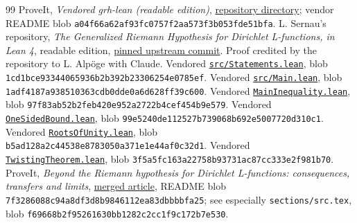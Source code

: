\documentclass[11pt]{article}
\theoremstyle{remark}\newtheorem{remark}[theorem]{Remark}
\newcommand{\code}[1]{\texttt{#1}}
\begin{document}
\begin{thebibliography}{99}
 ProveIt, \emph{Vendored grh-lean (readable edition)}, \href{https://github.com/VladimirReshetnikov/ProveIt/tree/main/Analysis/GeneralizedRiemannHypothesis/vendor/grh-lean}{repository directory}; vendor README blob \texttt{a04f66a62af93fc0757f2aa573f3b053fde51bfa}.
 L. Sernau's repository, \emph{The Generalized Riemann Hypothesis for Dirichlet L-functions, in Lean 4}, readable edition, \href{https://github.com/lsernau/grh-lean/tree/72fead102f663d5c7a407964a13dc0cf9d977207/grh}{pinned upstream commit}. Proof credited by the repository to L. Alp\"oge with Claude.
 Vendored \href{https://github.com/VladimirReshetnikov/ProveIt/blob/main/Analysis/GeneralizedRiemannHypothesis/vendor/grh-lean/grh/src/Statements.lean}{\texttt{src/Statements.lean}}, blob \texttt{1cd1bce93344065936b2b392b23306254e0785ef}.
 Vendored \href{https://github.com/VladimirReshetnikov/ProveIt/blob/main/Analysis/GeneralizedRiemannHypothesis/vendor/grh-lean/grh/src/Main.lean}{\texttt{src/Main.lean}}, blob \texttt{1adf4187a938510363cdb0dde0a6d628ff39c600}.
 Vendored \href{https://github.com/VladimirReshetnikov/ProveIt/blob/main/Analysis/GeneralizedRiemannHypothesis/vendor/grh-lean/grh/src/New/Reduction/MainInequality.lean}{\texttt{MainInequality.lean}}, blob \texttt{97f83ab52b2feb420e952a2722b4cef454b9e579}.
 Vendored \href{https://github.com/VladimirReshetnikov/ProveIt/blob/main/Analysis/GeneralizedRiemannHypothesis/vendor/grh-lean/grh/src/New/Reduction/OneSidedBound.lean}{\texttt{OneSidedBound.lean}}, blob \texttt{99e5240de112527b739068b692e5007720d310c1}.
 Vendored \href{https://github.com/VladimirReshetnikov/ProveIt/blob/main/Analysis/GeneralizedRiemannHypothesis/vendor/grh-lean/grh/src/New/Congruences/Selmer/RootsOfUnity.lean}{\texttt{RootsOfUnity.lean}}, blob \texttt{b5ad128a2c44538e8783050a371e1e44af0c32d1}.
 Vendored \href{https://github.com/VladimirReshetnikov/ProveIt/blob/main/Analysis/GeneralizedRiemannHypothesis/vendor/grh-lean/grh/src/New/Congruences/Selmer/TwistingTheorem.lean}{\texttt{TwistingTheorem.lean}}, blob \texttt{3f5a5fc163a22758b93731ac87cc333e2f981b70}.
 ProveIt, \emph{Beyond the Riemann hypothesis for Dirichlet L-functions: consequences, transfers and limits}, \href{https://github.com/VladimirReshetnikov/ProveIt/tree/main/Analysis/GeneralizedRiemannHypothesis/Article}{merged article}, README blob \texttt{7f3286088c94a8df3d8b9846112ea83dbbbbfa25}; see especially \code{sections/src.tex}, blob \texttt{f69668b2f95261630bb1282c2cc1f9c172b7e530}.

\end{thebibliography}
\end{document}
